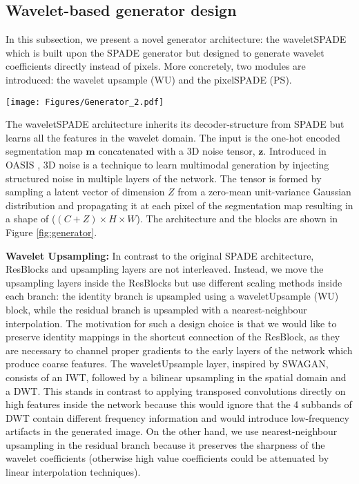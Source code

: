\documentclass{article}
\begin{document}
 \vspace{-1em}
\subsection{Wavelet-based generator design}
In this subsection, we present a novel generator architecture: the waveletSPADE which is built upon the SPADE generator but designed to generate wavelet coefficients directly instead of pixels. More concretely, two modules are introduced: the wavelet upsample (WU) and the pixelSPADE (PS).
\begin{figure*}[t]
    \centering
    \begin{minipage}{\textwidth}
    \texttt{[image: Figures/Generator\_2.pdf]}
    \end{minipage}
    \caption{The proposed waveletSPADE generator architecture (a) builds upon the OASIS generator \cite{schonfeld2021you} by replacing the ResBlocks with the depicted waveletResBlock (b) which encompasses the novel pixelSPADE (c) as well as the WU blocks (d). The number of channels per layer is shown in each waveletResBlock. }
    \label{fig:generator}
    \vspace{-1em}
\end{figure*} The waveletSPADE architecture inherits its decoder-structure from SPADE but learns all the features in the wavelet domain. The input is the one-hot encoded segmentation map $\mathbf{m}$ concatenated with a 3D noise tensor, $\mathbf{z}$. Introduced in OASIS \cite{alharbi2020disentangled, schonfeld2021you}, 3D noise is a technique to learn multimodal generation by injecting structured noise in multiple layers of the network. The tensor is formed by sampling a latent vector of dimension $Z$ from a zero-mean unit-variance Gaussian distribution and propagating it at each pixel of the segmentation map resulting in a shape of ($(C+Z) \times H \times W$). The architecture and the blocks are shown in Figure \ref{fig:generator}.

{\bf Wavelet Upsampling: } In contrast to the original SPADE architecture, ResBlocks and upsampling layers are not interleaved. Instead, we move the upsampling layers inside the ResBlocks but use different scaling methods inside each branch: the identity branch is upsampled using a waveletUpsample (WU) block, while the residual branch is upsampled with a nearest-neighbour interpolation. The motivation for such a design choice is that we would like to preserve identity mappings in the shortcut connection of the ResBlock, as they are necessary to channel proper gradients to the early layers of the network which produce coarse features. The waveletUpsample layer, inspired by SWAGAN\cite{Gal2021SWAGANAS}, consists of an IWT, followed by a bilinear upsampling in the spatial domain and a DWT. This stands in contrast to applying transposed convolutions directly on high features inside the network because this would ignore that the 4 subbands of DWT contain different frequency information and would introduce low-frequency artifacts in the generated image. On the other hand, we use nearest-neighbour upsampling in the residual branch because it preserves the sharpness of the wavelet coefficients (otherwise high value coefficients could be attenuated by linear interpolation techniques).
\end{document}
